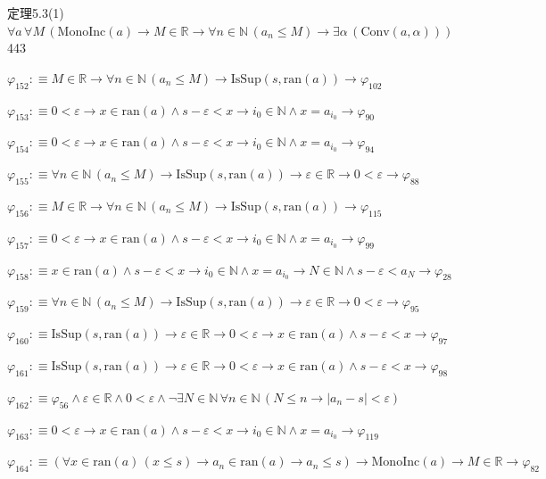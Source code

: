 \begin{fullproof}{定理5.3(1)}{$\forall a\,\forall M\,(\mathrm{MonoInc}(a) \to M \in \mathbb{R} \to \forall n \in \mathbb{N}\,(a_{n} \leq M) \to \exists \alpha\,(\mathrm{Conv}(a,\alpha)))$}{443}
\begin{abbrevlist}
\item $\varphi_{152} :\equiv M \in \mathbb{R} \to \forall n \in \mathbb{N}\,(a_{n} \leq M) \to \mathrm{IsSup}(s,\mathrm{ran}(a)) \to \varphi_{102}$
\item $\varphi_{153} :\equiv 0 < \varepsilon \to x \in \mathrm{ran}(a) \land s - \varepsilon < x \to i_{0} \in \mathbb{N} \land x = a_{i_{0}} \to \varphi_{90}$
\item $\varphi_{154} :\equiv 0 < \varepsilon \to x \in \mathrm{ran}(a) \land s - \varepsilon < x \to i_{0} \in \mathbb{N} \land x = a_{i_{0}} \to \varphi_{94}$
\item $\varphi_{155} :\equiv \forall n \in \mathbb{N}\,(a_{n} \leq M) \to \mathrm{IsSup}(s,\mathrm{ran}(a)) \to \varepsilon \in \mathbb{R} \to 0 < \varepsilon \to \varphi_{88}$
\item $\varphi_{156} :\equiv M \in \mathbb{R} \to \forall n \in \mathbb{N}\,(a_{n} \leq M) \to \mathrm{IsSup}(s,\mathrm{ran}(a)) \to \varphi_{115}$
\item $\varphi_{157} :\equiv 0 < \varepsilon \to x \in \mathrm{ran}(a) \land s - \varepsilon < x \to i_{0} \in \mathbb{N} \land x = a_{i_{0}} \to \varphi_{99}$
\item $\varphi_{158} :\equiv x \in \mathrm{ran}(a) \land s - \varepsilon < x \to i_{0} \in \mathbb{N} \land x = a_{i_{0}} \to N \in \mathbb{N} \land s - \varepsilon < a_{N} \to \varphi_{28}$
\item $\varphi_{159} :\equiv \forall n \in \mathbb{N}\,(a_{n} \leq M) \to \mathrm{IsSup}(s,\mathrm{ran}(a)) \to \varepsilon \in \mathbb{R} \to 0 < \varepsilon \to \varphi_{95}$
\item $\varphi_{160} :\equiv \mathrm{IsSup}(s,\mathrm{ran}(a)) \to \varepsilon \in \mathbb{R} \to 0 < \varepsilon \to x \in \mathrm{ran}(a) \land s - \varepsilon < x \to \varphi_{97}$
\item $\varphi_{161} :\equiv \mathrm{IsSup}(s,\mathrm{ran}(a)) \to \varepsilon \in \mathbb{R} \to 0 < \varepsilon \to x \in \mathrm{ran}(a) \land s - \varepsilon < x \to \varphi_{98}$
\item $\varphi_{162} :\equiv \varphi_{56} \land \varepsilon \in \mathbb{R} \land 0 < \varepsilon \land \neg \exists N \in \mathbb{N}\,\forall n \in \mathbb{N}\,(N \leq n \to \lvert a_{n} - s \rvert < \varepsilon)$
\item $\varphi_{163} :\equiv 0 < \varepsilon \to x \in \mathrm{ran}(a) \land s - \varepsilon < x \to i_{0} \in \mathbb{N} \land x = a_{i_{0}} \to \varphi_{119}$
\item $\varphi_{164} :\equiv (\forall x \in \mathrm{ran}(a)\,(x \leq s) \to a_{n} \in \mathrm{ran}(a) \to a_{n} \leq s) \to \mathrm{MonoInc}(a) \to M \in \mathbb{R} \to \varphi_{82}$

\end{abbrevlist}
\end{fullproof}
